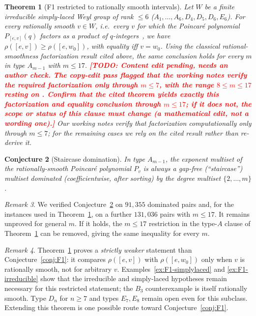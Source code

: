\documentclass[11pt]{amsart}
\theoremstyle{plain}
\newtheorem{theorem}{Theorem}[section]
\newtheorem{conjecture}[theorem]{Conjecture}
\theoremstyle{definition}
\theoremstyle{remark}
\newtheorem{remark}[theorem]{Remark}
\newcommand{\W}{W}
\newcommand{\TODO}[1]{\textcolor{red}{\textbf{[TODO: #1]}}}
\begin{document}
\begin{theorem}[F1 restricted to rationally smooth intervals]
\label{thm:F1-smooth}
Let $\W$ be a finite irreducible simply-laced Weyl group of rank $\le 6$
($A_1,\dots,A_6,D_4,D_5,D_6,E_6$). For every rationally smooth $v\in\W$,
i.e.\ every $v$ for which the Poincar\'e polynomial $P_{[e,v]}(q)$ factors
as a product of $q$-integers~\cite{carrell1994}, we have
$\rho([e,v])\ge\rho([e,w_0])$, with equality iff $v=w_0$. Using the
classical rational-smoothness factorization result cited above, the same
conclusion holds for every $m$ in type $A_{m-1}$ with $m\le17$.
\TODO{Content edit pending, needs an author check. The copy-edit pass flagged that
the working notes verify the required factorization only through $m\le7$, with the
range $8\le m\le17$ resting on \cite{carrell1994}. Confirm that the cited theorem
yields exactly this factorization and equality conclusion through $m\le17$; if it
does not, the scope or status of this clause must change (a mathematical edit, not
a wording one).}
Our
working notes verify that factorization computationally only through
$m\le7$; for the remaining cases we rely on the cited result rather than
re-derive it.
\end{theorem}

\begin{conjecture}[Staircase domination]
\label{conj:staircase}
In type $A_{m-1}$, the exponent multiset of the rationally-smooth
Poincar\'e polynomial $P_v$ is always a gap-free (``staircase'') multiset
dominated (coefficientwise, after sorting) by the degree multiset
$\{2,\dots,m\}$.
\end{conjecture}

\begin{remark}
We verified Conjecture~\ref{conj:staircase} on $91{,}355$ dominated pairs
and, for the instances used in Theorem~\ref{thm:F1-smooth}, on a further
$131{,}036$ pairs with $m\le17$. It remains unproved for general $m$. If
it holds, the $m\le17$ restriction in the type-$A$ clause of
Theorem~\ref{thm:F1-smooth} can be removed, giving the same inequality for
every $m$.
\end{remark}

\begin{remark}
Theorem~\ref{thm:F1-smooth} proves a \emph{strictly weaker} statement than
Conjecture~\ref{conj:F1}: it compares $\rho([e,v])$ with
$\rho([e,w_0])$ only when $v$ is rationally smooth, not for arbitrary
$v$. Examples~\ref{ex:F1-simplylaced} and
\ref{ex:F1-irreducible} show that the irreducible and simply-laced
hypotheses remain necessary for this restricted statement; the $B_3$
counterexample is itself rationally smooth. Type $D_n$ for $n\ge7$ and
types $E_7,E_8$ remain open even for this subclass. Extending this theorem
is one possible route toward Conjecture~\ref{conj:F1}.
\end{remark}
\end{document}
